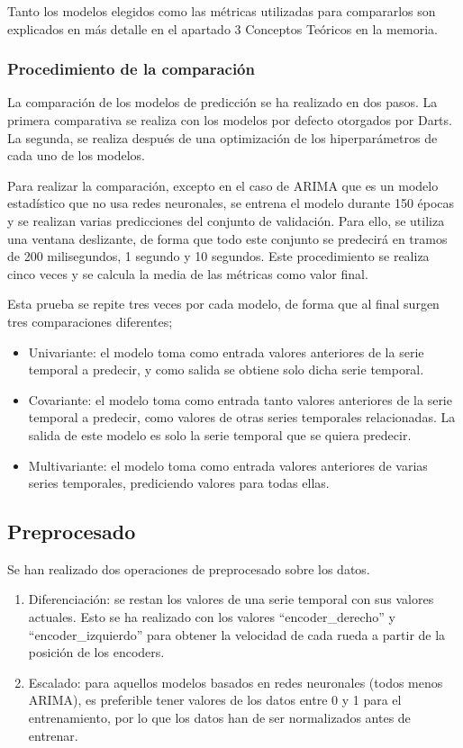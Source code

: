 Tanto los modelos elegidos como las métricas utilizadas para compararlos son explicados en más detalle en el apartado 3 Conceptos
Teóricos en la memoria.

\subsubsection{Procedimiento de la comparación}

La comparación de los modelos de predicción se ha realizado en dos pasos. La primera comparativa se 
realiza con los modelos por defecto otorgados por Darts. La segunda, se realiza después de una 
optimización de los hiperparámetros de cada uno de los modelos.

Para realizar la comparación, excepto en el caso de ARIMA que es un modelo estadístico que no usa redes neuronales, 
se entrena el modelo durante 150 épocas y se realizan varias predicciones del conjunto de validación. Para ello, 
se utiliza una ventana deslizante, de forma que todo este conjunto se predecirá en tramos de 200 milisegundos, 1 segundo 
y 10 segundos.
Este procedimiento se realiza cinco veces y se calcula la media de las métricas como valor final.

Esta prueba se repite tres veces por cada modelo, de forma que al final surgen tres comparaciones 
diferentes;
\begin{itemize}
    \item Univariante: el modelo toma como entrada valores anteriores de la serie temporal a predecir,
        y como salida se obtiene solo dicha serie temporal.
    \item Covariante: el modelo toma como entrada tanto valores anteriores de la serie temporal a predecir, 
        como valores de otras series temporales relacionadas. La salida de este modelo es solo la serie temporal 
        que se quiera predecir.
    \item Multivariante: el modelo toma como entrada valores anteriores de varias series temporales, prediciendo valores
        para todas ellas.
\end{itemize}

\subsection{Preprocesado}

Se han realizado dos operaciones de preprocesado sobre los datos.
\begin{enumerate}
    \item Diferenciación: se restan los valores de una serie temporal con sus valores actuales.
        Esto se ha realizado con los valores ``encoder\_derecho'' y ``encoder\_izquierdo'' para obtener
        la velocidad de cada rueda a partir de la posición de los encoders.
    \item Escalado: para aquellos modelos basados en redes neuronales (todos menos ARIMA), es preferible
        tener valores de los datos entre 0 y 1 para el entrenamiento, por lo que los datos han de 
        ser normalizados antes de entrenar.
\end{enumerate}


